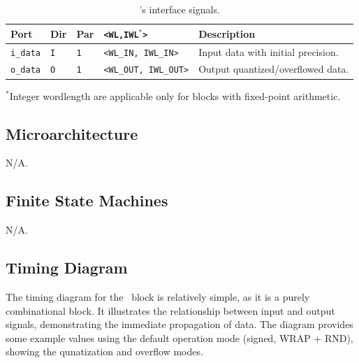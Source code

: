 \begin{table}[htb]	
    \centering
    \begin{tabular}{|>{\centering\arraybackslash}p{1.5cm}|
                     >{\centering\arraybackslash}p{0.5cm}|
                     >{\centering\arraybackslash}p{0.7cm}|
                     >{\centering\arraybackslash}p{1.5cm}|
                     >{\raggedright\arraybackslash}p{3.0cm}|}
		\arrayrulecolor{sandnavy!50}\hline
		\rowcolor{sandnavy!50}\hline
        \textcolor{sandwhite}{\textbf{Port}}          &
        \textcolor{sandwhite}{\textbf{Dir}}           &
        \textcolor{sandwhite}{\textbf{Par}}           &
        \textcolor{sandwhite}{\textbf{\texttt{<WL,IWL$^*$>}}}    &
        \textcolor{sandwhite}{\textbf{Description}} \\ \hline
        \texttt{i\_data}       & \texttt{I} & \texttt{1} & \texttt{\small <WL\_IN, IWL\_IN>}  & Input data with initial precision. \\ \hline
        \texttt{o\_data}       & \texttt{O} & \texttt{1} & \texttt{\small <WL\_OUT, IWL\_OUT>}& Output quantized/overflowed data. \\ \hline
	\end{tabular}
    \footnotesize{$^*$Integer wordlength are applicable only for blocks with fixed-point arithmetic.}
    \caption{\blockname's interface signals.}
    \label{tab:interface}
\end{table}

\subsection{Microarchitecture}
N/A.

\subsection{Finite State Machines}
N/A.

\subsection{Timing Diagram}
The timing diagram for the \blockname\ block is relatively simple, as it is a purely combinational block. It illustrates the relationship between input and output signals, demonstrating the immediate propagation of data. The diagram provides some example values using the default operation mode (signed, WRAP + RND), showing the qunatization and overflow modes.

